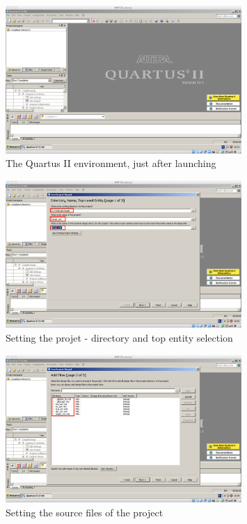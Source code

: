\begin{figure}[htbp]
  \centering
 \includegraphics[angle=90,width=0.8\textwidth]{./figs/simple-quartus-1.pdf}
  \caption{The Quartus II environment, just after launching}
  \label{fig:simple-quartus-1}
\end{figure}

\begin{figure}[htbp]
  \centering
 \includegraphics[angle=90,width=0.8\textwidth]{./figs/simple-quartus-2.pdf}
  \caption{Setting the projet - directory and top entity selection}
  \label{fig:simple-quartus-2}
\end{figure}

\begin{figure}[htbp]
  \centering
 \includegraphics[angle=90,width=0.8\textwidth]{./figs/simple-quartus-3.pdf}
  \caption{Setting the source files of the project}
  \label{fig:simple-quartus-3}
\end{figure}

